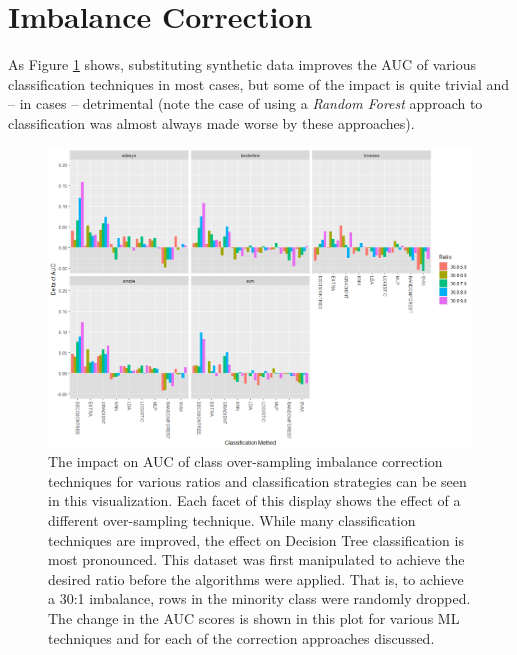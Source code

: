\documentclass[letterpaper]{report}
\begin{document}
\section{Imbalance Correction}
As Figure \ref{fig:imbalance} shows, substituting synthetic data improves the AUC of various classification techniques in most cases, but some of the impact is quite trivial and -- in cases -- detrimental (note the case of using a \textit{Random Forest} approach to classification was almost always made worse by these approaches). 
%
%
%
%
%
%
\begin{figure}[H]
	\centering
	\includegraphics[width=0.9\linewidth]{./figures/imbalance.png}
	\caption[Class imbalance correction techniques]{The impact on AUC of class over-sampling imbalance correction techniques for various ratios and classification strategies can be seen in this visualization. Each facet of this display shows the effect of a different over-sampling technique. While many classification techniques are improved, the effect on Decision Tree classification is most pronounced. This dataset was first manipulated to achieve the desired ratio before the algorithms were applied. That is, to achieve a 30:1 imbalance, rows in the minority class were randomly dropped. The change in the AUC scores is shown in this plot for various ML techniques and for each of the correction approaches discussed.}
	\label{fig:imbalance}
\end{figure}
\end{document}
